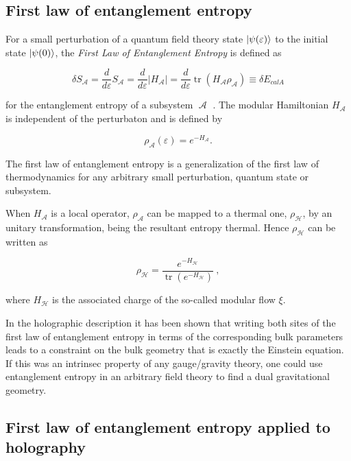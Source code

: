 \documentclass[lettersize,journal]{IEEEtran}
\providecommand{\abs}[1]{\lvert#1\rvert}
\providecommand{\eq}[2]{
    \begin{equation}
        #2
    \label{eq:#1}
    \end{equation}
}
\DeclareMathOperator{\calA}{\mathcal{A}}
\DeclareMathOperator{\calH}{\mathcal{H}}
\DeclareMathOperator{\tr}{tr}
\begin{document}
\subsection{First law of entanglement entropy} \label{ss:FLEE}

For a small perturbation of a quantum field theory state $\ket{\psi(\varepsilon)}$ to the initial state $\ket{\psi(0)}$, the \textit{First Law of Entanglement Entropy} is defined as
\eq{FLEE}{
    \delta S_{\calA} = \frac{d}{d \varepsilon} S_{\calA} = \frac{d}{d \varepsilon} \abs{H_{\calA}} = \frac{d}{d \varepsilon} \tr (H_{\calA} \rho_{\calA}) \equiv \delta E_{calA}
}
for the entanglement entropy of a subsystem $\calA$ \cite{fareghbal_first_2019}. The modular Hamiltonian $H_{\calA}$ is independent of the perturbaton and is defined by
\eq{modularH}{
    \rho_{\calA} (\varepsilon) = e^{-H_{\calA}}.
}

The first law of entanglement entropy is a generalization of the first law of thermodynamics for any arbitrary small perturbation, quantum state or subsystem.

When $H_{\calA}$ is a local operator, $\rho_{\calA}$ can be mapped to a thermal one, $\rho_{\calH}$, by an unitary transformation, being the resultant entropy thermal. Hence $\rho_{\calH}$ can be written as
\eq{modularH2}{
    \rho_{\calH} = \frac{e^{-H_{\calH}}}{\tr (e^{-H_{\calH}})} \ ,
}
where $H_{\calH}$ is the associated charge of the so-called modular flow $\xi$.

In the holographic description \cite{fareghbal_first_2019} it has been shown that writing both sites of the first law of entanglement entropy in terms of the corresponding bulk parameters leads to a constraint on the bulk geometry that is exactly the Einstein equation. If this was an intrinsec property of any gauge/gravity theory, one could use entanglement entropy in an arbitrary field theory to find a dual gravitational geometry.

\subsection{First law of entanglement entropy applied to holography} \label{ss:FLEE_H}






\printbibliography
\end{document}
